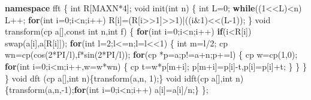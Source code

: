 \documentclass[
]{article}
\newenvironment{Shaded}{}{}
\newcommand{\AttributeTok}[1]{\textcolor[rgb]{0.49,0.56,0.16}{#1}}
\newcommand{\ControlFlowTok}[1]{\textcolor[rgb]{0.00,0.44,0.13}{\textbf{#1}}}
\newcommand{\DataTypeTok}[1]{\textcolor[rgb]{0.56,0.13,0.00}{#1}}
\newcommand{\DecValTok}[1]{\textcolor[rgb]{0.25,0.63,0.44}{#1}}
\newcommand{\KeywordTok}[1]{\textcolor[rgb]{0.00,0.44,0.13}{\textbf{#1}}}
\newcommand{\NormalTok}[1]{#1}
\begin{document}
\begin{Shaded}
\begin{Highlighting}[]
\KeywordTok{namespace}\NormalTok{ fft}
\NormalTok{\{}
    \DataTypeTok{int}\NormalTok{ R[MAXN*}\DecValTok{4}\NormalTok{];}
    \DataTypeTok{void}\NormalTok{ init(}\DataTypeTok{int}\NormalTok{ n)}
\NormalTok{    \{}
        \DataTypeTok{int}\NormalTok{ L=}\DecValTok{0}\NormalTok{;}
        \ControlFlowTok{while}\NormalTok{((}\DecValTok{1}\NormalTok{\textless{}\textless{}L)\textless{}n) L++;}
        \ControlFlowTok{for}\NormalTok{(}\DataTypeTok{int}\NormalTok{ i=}\DecValTok{0}\NormalTok{;i\textless{}n;i++)}
\NormalTok{            R[i]=(R[i\textgreater{}\textgreater{}}\DecValTok{1}\NormalTok{]\textgreater{}\textgreater{}}\DecValTok{1}\NormalTok{)|((i\&}\DecValTok{1}\NormalTok{)\textless{}\textless{}(L{-}}\DecValTok{1}\NormalTok{));}
\NormalTok{    \}}
    \DataTypeTok{void}\NormalTok{ transform(cp a[],}\AttributeTok{const} \DataTypeTok{int}\NormalTok{ n,}\DataTypeTok{int}\NormalTok{ f)}
\NormalTok{    \{}
        \ControlFlowTok{for}\NormalTok{(}\DataTypeTok{int}\NormalTok{ i=}\DecValTok{0}\NormalTok{;i\textless{}n;i++)}
            \ControlFlowTok{if}\NormalTok{(i\textless{}R[i])}
\NormalTok{                swap(a[i],a[R[i]]);}
        \ControlFlowTok{for}\NormalTok{(}\DataTypeTok{int}\NormalTok{ l=}\DecValTok{2}\NormalTok{;l\textless{}=n;l=l\textless{}\textless{}}\DecValTok{1}\NormalTok{)}
\NormalTok{        \{}
            \DataTypeTok{int}\NormalTok{ m=l/}\DecValTok{2}\NormalTok{;}
\NormalTok{            cp wn=cp(cos(}\DecValTok{2}\NormalTok{*PI/l),f*sin(}\DecValTok{2}\NormalTok{*PI/l));}
            \ControlFlowTok{for}\NormalTok{(cp *p=a;p!=a+n;p+=l)}
\NormalTok{            \{}
\NormalTok{                cp w=cp(}\DecValTok{1}\NormalTok{,}\DecValTok{0}\NormalTok{);}
                \ControlFlowTok{for}\NormalTok{(}\DataTypeTok{int}\NormalTok{ i=}\DecValTok{0}\NormalTok{;i\textless{}m;i++,w=w*wn)}
\NormalTok{                \{}
\NormalTok{                    cp t=w*p[m+i];}
\NormalTok{                    p[m+i]=p[i]{-}t,p[i]=p[i]+t;}
\NormalTok{                \}}
\NormalTok{            \}}
\NormalTok{        \}}
\NormalTok{    \}}
    \DataTypeTok{void}\NormalTok{ dft (cp a[],}\DataTypeTok{int}\NormalTok{ n)\{transform(a,n, }\DecValTok{1}\NormalTok{);\}}
    \DataTypeTok{void}\NormalTok{ idft(cp a[],}\DataTypeTok{int}\NormalTok{ n)\{transform(a,n,{-}}\DecValTok{1}\NormalTok{);}\ControlFlowTok{for}\NormalTok{(}\DataTypeTok{int}\NormalTok{ i=}\DecValTok{0}\NormalTok{;i\textless{}n;i++) a[i]=a[i]/n;\}}
\NormalTok{\};}


\end{Highlighting}
\end{Shaded}
\end{document}
